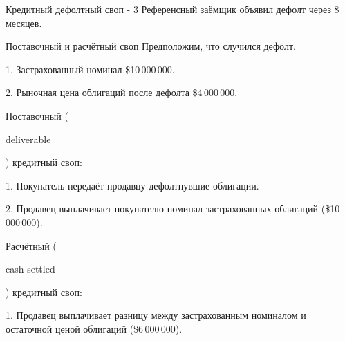 \documentclass{beamer}
\newcommand{\en}[1]{\begin{otherlanguage}{english}#1\end{otherlanguage}}
\begin{document}
\begin{frame}{Кредитный дефолтный своп - 3}
\justify
Референсный заёмщик объявил дефолт через 8 месяцев.

\justify
\centering
{}


\end{frame}



\begin{frame}{Поставочный и расчётный своп}
\justify
Предположим, что случился дефолт.

1. Застрахованный номинал \$10\,000\,000.

2. Рыночная цена облигаций после дефолта \$4\,000\,000.

\justify
\alert{Поставочный} (\en{deliverable}) кредитный своп:

1. Покупатель передаёт продавцу дефолтнувшие облигации.

2. Продавец выплачивает покупателю номинал застрахованных облигаций (\$10\,000\,000).

\justify
\alert{Расчётный} (\en{cash settled}) кредитный своп:

1. Продавец выплачивает разницу между застрахованным номиналом и остаточной ценой облигаций (\$6\,000\,000).

\end{frame}
\end{document}
